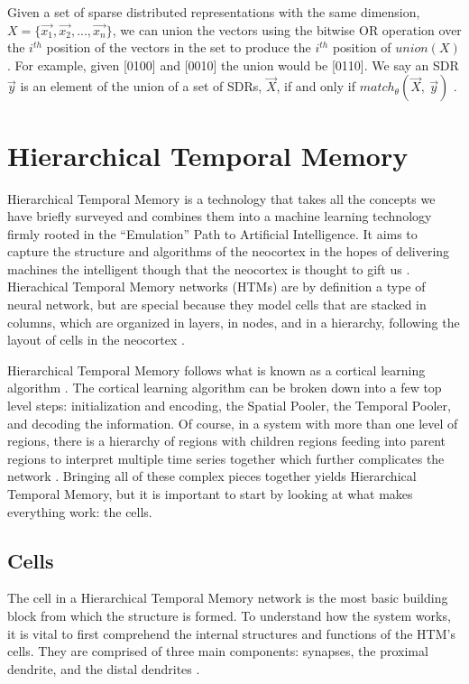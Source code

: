 \documentclass[oneside,12pt,openany]{book}
\begin{document}
	Given a set of sparse distributed representations with the same dimension, $X =\{\overrightarrow{x_{1}}, \overrightarrow{x_{2}}, ...,\overrightarrow{x_{n}}\}$, we can union the vectors using the bitwise OR operation over the $i^{th}$ position of the vectors in the set to produce the $i^{th}$ position of $union(X)$ \cite{Properties}. For example, given [0100] and [0010] the union would be [0110]. We say an SDR $\overrightarrow{y}$ is an element of the union of a set of SDRs, $\overrightarrow{X}$, if and only if $match_{\theta}(\overrightarrow{X},\ \overrightarrow{y})$ \cite{Properties}.
	
	\chapter{Hierarchical Temporal Memory}
	
	Hierarchical Temporal Memory is a technology that takes all the concepts we have briefly surveyed and combines them into a machine learning technology firmly rooted in the ``Emulation'' Path to Artificial Intelligence. It aims to capture the structure and algorithms of the neocortex in the hopes of delivering machines the intelligent though that the neocortex is thought to gift us \cite{Whitepaper}. Hierachical Temporal Memory networks (HTMs) are by definition a type of neural network, but are special because they model cells that are stacked in columns, which are organized in layers, in nodes, and in a hierarchy, following the layout of cells in the neocortex \cite{Whitepaper}.
	
	Hierarchical Temporal Memory follows what is known as a cortical learning algorithm \cite{Principles}. The cortical learning algorithm can be broken down into a few top level steps: initialization and encoding, the Spatial Pooler, the Temporal Pooler, and decoding the information. Of course, in a system with more than one level of regions, there is a hierarchy of regions with children regions feeding into parent regions to interpret multiple time series together which further complicates the network \cite{Dillon}. Bringing all of these complex pieces together yields Hierarchical Temporal Memory, but it is important to start by looking at what makes everything work: the cells.
	
	\section{Cells}
	
	The cell in a Hierarchical Temporal Memory network is the most basic building block from which the structure is formed. To understand how the system works, it is vital to first comprehend the internal structures and functions of the HTM's cells. They are comprised of three main components: synapses, the proximal dendrite, and the distal dendrites \cite{Whitepaper}.
	
\end{document}
